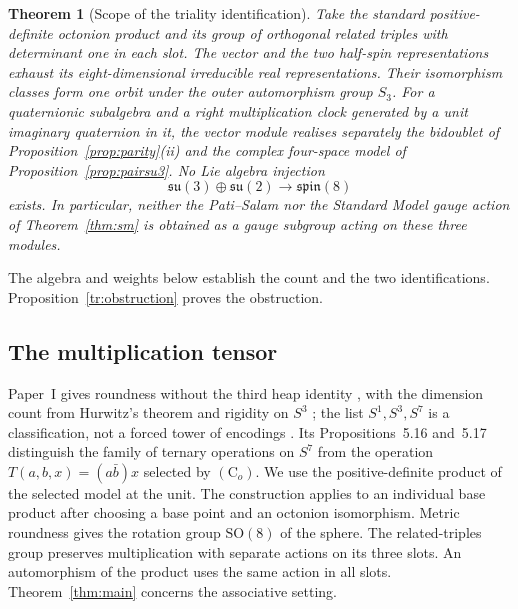 \documentclass[aps,pra,onecolumn,superscriptaddress,nofootinbib,10pt]{revtex4-2}
\newtheorem{theorem}{Theorem}
\theoremstyle{definition}
\theoremstyle{remark}
\newcommand{\SO}{\mathrm{SO}}
\begin{document}
\begin{theorem}[Scope of the triality identification]\label{tr:main}
Take the standard positive-definite octonion product and its group of
orthogonal related triples with determinant one in each slot. The vector
and the two half-spin representations exhaust its eight-dimensional
irreducible real representations. Their isomorphism classes form one orbit
under the outer automorphism group \(S_3\). For a quaternionic subalgebra and a right multiplication clock generated
by a unit imaginary quaternion in it, the vector module realises separately the
bidoublet of Proposition~\ref{prop:parity}(ii) and the complex
four-space model of Proposition~\ref{prop:pairsu3}. No Lie algebra
injection
\[
 \mathfrak{su}(3)\oplus\mathfrak{su}(2)\longrightarrow\mathfrak{spin}(8)
\]
exists. In particular, neither the Pati--Salam nor the Standard Model gauge
action of Theorem~\ref{thm:sm} is obtained as a gauge subgroup acting on
these three modules.
\end{theorem}
The algebra and weights below establish the count and the two
identifications. Proposition~\ref{tr:obstruction} proves the obstruction.

\subsection{The multiplication tensor}\label{tr:algebra}

Paper~I gives roundness without the third heap identity
\cite[Thm.~5.18, Cor.~5.19]{PaperI}, with the dimension count from Hurwitz's theorem \cite[Prop.~5.13]{PaperI} and
rigidity on $S^3$ \cite[Thm.~5.15]{PaperI}; the list $S^1,S^3,S^7$ is a classification, not a forced tower of
encodings \cite[Rem.~5C.5]{PaperI}. Its Propositions~5.16
and~5.17 distinguish the
family of ternary operations on \(S^7\) from the operation
\(T(a,b,x)=(a\bar b)x\) selected by \((\mathrm C_o)\).
We use the positive-definite product of the selected model at the unit.
The construction applies to an individual base product after choosing a
base point and an octonion isomorphism. Metric roundness gives the rotation
group \(\SO(8)\) of the sphere. The related-triples group
preserves multiplication with separate actions on its three slots.
An automorphism of the product uses the same action in all slots.
Theorem~\ref{thm:main} concerns the associative setting.
\end{document}
